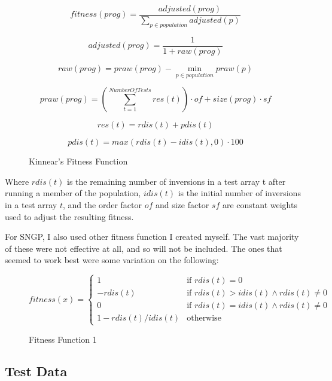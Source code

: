 \documentclass{article}
\begin{document}
        \begin{figure}[H]
            $$fitness(prog) = \frac{adjusted(prog)}{\sum_{p\in population}^{}adjusted(p)}$$
            
            $$adjusted(prog) = \frac{1}{1 + raw(prog)}$$
            
            $$raw(prog) = praw(prog) - \min_{p\in population} praw(p)$$
            
            $$praw(prog) = \left(\sum_{t = 1}^{Number Of Tests}res(t)\right) \cdot of + size(prog) \cdot sf$$
            
            $$res(t) = rdis(t) + pdis(t)$$
            
            $$pdis(t) = max(rdis(t) - idis(t), 0) \cdot 100$$
            
            \caption{Kinnear's Fitness Function}
            
            \label{kinnear_fitness}		
        
        \end{figure}
        Where $rdis(t)$ is the remaining number of inversions in a test array t after running a member of the population, $idis(t)$ is the initial number of inversions in a test array $t$, and the order factor $of$ and size factor $sf$ are constant weights used to adjust the resulting fitness.
        
        For SNGP, I also used other fitness function I created myself. The vast majority of these were not effective at all, and so will not be included. The ones that seemed to work best were some variation on the following:
        
        \begin{figure}[H]
        	$   fitness(x) =
        	\begin{cases} 
	        	1 & \mbox{if } rdis(t) = 0 \\
	        	-rdis(t) & \mbox{if } rdis(t) > idis(t) \land rdis(t) \neq 0 \\
	        	0 & \mbox{if }  rdis(t) = idis(t) \land rdis(t) \neq 0 \\
	        	1 - rdis(t)/idis(t) & \mbox{otherwise }
        	\end{cases}
        	$
        	
        	\caption{Fitness Function 1}
        	\label{ftns_func1}
        \end{figure}

    \subsection{Test Data}
        
\end{document}
